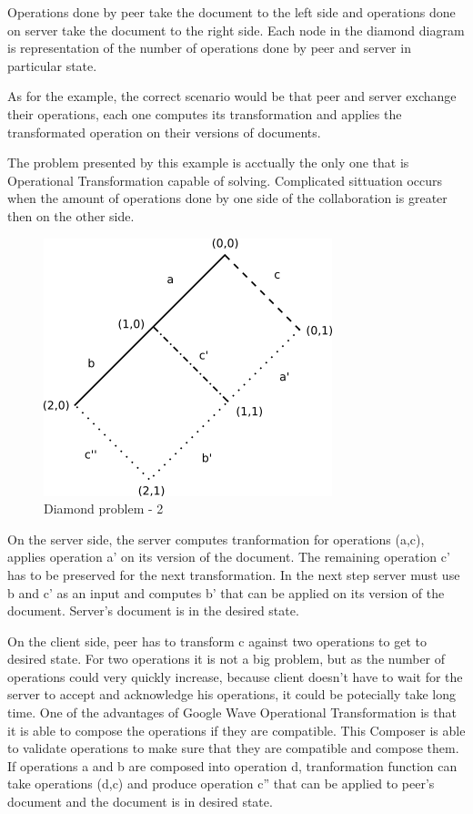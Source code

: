 \documentclass[12pt,oneside]{fithesis2}
\begin{document}
Operations done by peer take the document to the left side and operations done on server take the document to the right side. Each node in the diamond diagram is representation of the number of operations done by peer and server in particular state. \par As for the example, the correct scenario would be that peer and server exchange their operations, each one computes its transformation and applies the transformated operation on their versions of documents.\par The problem presented by this example is acctually the only one that is Operational Transformation capable of solving. Complicated sittuation occurs when the amount of operations done by one side of the collaboration is greater then on the other side. 
\begin{figure}[H]
\caption{Diamond problem - 2}
\centering
\vspace{5mm}
\includegraphics{diamond1}
\end{figure}
On the server side, the server computes tranformation for operations (a,c), applies operation a' on its version of the document. The remaining operation c' has to be preserved for the next transformation. In the next step server must use b and c' as an input and computes b' that can be applied on its version of the document. Server's document is in the desired state. \par On the client side, peer has to transform c against two operations to get to desired state. For two operations it is not a big problem, but as the number of operations could very quickly increase, because client doesn't have to wait for the server to accept and acknowledge his operations, it could be potecially take long time. One of the advantages of Google Wave Operational Transformation is that it is able to compose the operations if they are compatible. This Composer is able to validate operations to make sure that they are compatible and compose them. If operations a and b are composed into operation d, tranformation function can take operations (d,c) and produce operation c'' that can be applied to peer's document and the document is in desired state.   
\end{document}
